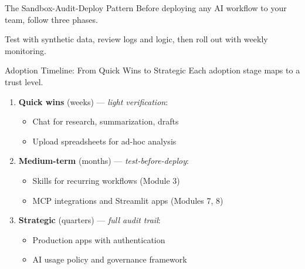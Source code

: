 \documentclass[aspectratio=169]{beamer}
\begin{document}
\begin{frame}{The Sandbox-Audit-Deploy Pattern}
Before deploying any AI workflow to your team, follow three phases.
\vspace{0.3cm}
\begin{center}
\end{center}
\vspace{0.3cm}
Test with synthetic data, review logs and logic, then roll out with weekly monitoring.
\end{frame}

\begin{frame}{Adoption Timeline: From Quick Wins to Strategic}
Each adoption stage maps to a trust level.
\vspace{0.3cm}
\begin{enumerate}
  \item \textbf{Quick wins} (weeks) --- \textit{light verification}:
  \begin{itemize}\small
    \item Chat for research, summarization, drafts
    \item Upload spreadsheets for ad-hoc analysis
  \end{itemize}
  \item \textbf{Medium-term} (months) --- \textit{test-before-deploy}:
  \begin{itemize}\small
    \item Skills for recurring workflows (Module 3)
    \item MCP integrations and Streamlit apps (Modules 7, 8)
  \end{itemize}
  \item \textbf{Strategic} (quarters) --- \textit{full audit trail}:
  \begin{itemize}\small
    \item Production apps with authentication
    \item AI usage policy and governance framework
  \end{itemize}
\end{enumerate}
\end{frame}
\end{document}
